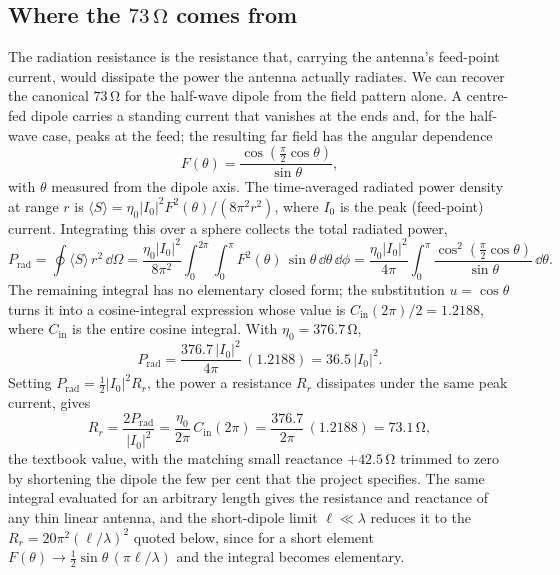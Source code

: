 

\subsection{Where the $73\,\si{\ohm}$ comes from}

The radiation resistance is the resistance that, carrying the antenna's
feed-point current, would dissipate the power the antenna actually
radiates. We can recover the canonical $73\,\si{\ohm}$ for the half-wave
dipole from the field pattern alone. A centre-fed dipole carries a
standing current that vanishes at the ends and, for the half-wave case,
peaks at the feed; the resulting far field has the angular dependence
\[
F(\theta) = \frac{\cos\!\left(\tfrac{\pi}{2}\cos\theta\right)}
{\sin\theta},
\]
with $\theta$ measured from the dipole axis. The time-averaged radiated
power density at range $r$ is $\langle S\rangle = \eta_0 |I_0|^{2}
F^{2}(\theta)/(8\pi^{2} r^{2})$, where $I_0$ is the peak (feed-point)
current. Integrating this over a sphere collects the total radiated
power,
\[
P_{\text{rad}} = \oint \langle S\rangle\, r^{2}\,\dd\Omega
= \frac{\eta_0 |I_0|^{2}}{8\pi^{2}} \int_{0}^{2\pi}\!\!\int_{0}^{\pi}
F^{2}(\theta)\,\sin\theta\,\dd\theta\,\dd\phi
= \frac{\eta_0 |I_0|^{2}}{4\pi} \int_{0}^{\pi}
\frac{\cos^{2}\!\left(\tfrac{\pi}{2}\cos\theta\right)}{\sin\theta}\,
\dd\theta.
\]
The remaining integral has no elementary closed form; the substitution
$u = \cos\theta$ turns it into a cosine-integral expression whose value
is $C_{\text{in}}(2\pi)/2 = 1.2188$, where $C_{\text{in}}$ is the entire
cosine integral. With $\eta_0 = 376.7\,\si{\ohm}$,
\[
P_{\text{rad}} = \frac{376.7\,|I_0|^{2}}{4\pi}\,(1.2188)
= 36.5\,|I_0|^{2}.
\]
Setting $P_{\text{rad}} = \tfrac{1}{2}|I_0|^{2} R_r$, the power a
resistance $R_r$ dissipates under the same peak current, gives
\[
R_r = \frac{2 P_{\text{rad}}}{|I_0|^{2}} = \frac{\eta_0}{2\pi}\,
C_{\text{in}}(2\pi) = \frac{376.7}{2\pi}\,(1.2188) = 73.1\,\si{\ohm},
\]
the textbook value, with the matching small reactance $+42.5\,\si{\ohm}$
trimmed to zero by shortening the dipole the few per cent that the
project specifies. The same integral evaluated for an arbitrary length
gives the resistance and reactance of any thin linear antenna, and the
short-dipole limit $\ell\ll\lambda$ reduces it to the $R_r = 20\pi^{2}
(\ell/\lambda)^{2}$ quoted below, since for a short element $F(\theta)
\to \tfrac{1}{2}\sin\theta\,(\pi\ell/\lambda)$ and the integral becomes
elementary.

